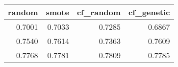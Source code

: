 \begin{tabular}{rrrr}
\toprule
 random &  smote &  cf\_random &  cf\_genetic \\
\midrule
 0.7001 & 0.7033 &     0.7285 &      0.6867 \\
 0.7540 & 0.7614 &     0.7363 &      0.7609 \\
 0.7768 & 0.7781 &     0.7809 &      0.7785 \\
\bottomrule
\end{tabular}
